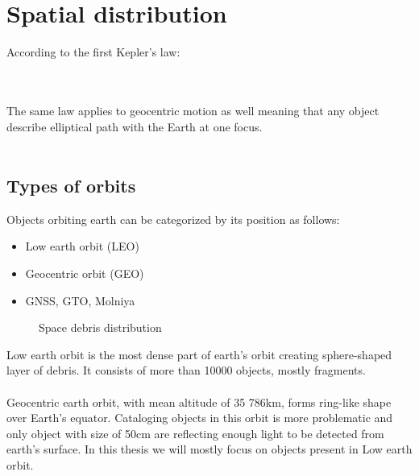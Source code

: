 \documentclass[12pt, a4paper, oneside]{book}
\begin{document}
\section{Spatial distribution}

According to the first Kepler's law:

\\
\\
The same law applies to geocentric motion as well meaning that any object describe elliptical path with the Earth at one focus.
\\
\\

\subsection{Types of orbits}

Objects orbiting earth can be categorized by its position as follows:
\begin{itemize}
    \item{Low earth orbit (LEO)}
    \item{Geocentric orbit (GEO)}
    \item{GNSS, GTO, Molniya}
\end{itemize}

\begin{figure}
    \centering
    \qquad
    \caption{Space debris distribution}%
    \label{fig:example}%
\end{figure}
Low earth orbit is the most dense part of earth's orbit creating sphere-shaped layer of debris.
It consists of more than 10000 objects, mostly fragments.
\\
\\
Geocentric earth orbit, with mean altitude of 35 786km, forms ring-like shape over Earth's equator.
Cataloging objects in this orbit is more problematic and only object with size of 50cm are reflecting enough light to be detected from earth's surface.
In this thesis we will mostly focus on objects present in Low earth orbit.
\end{document}
